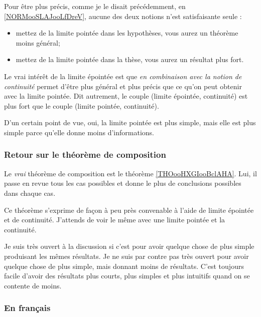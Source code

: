 Pour être plus précis, comme je le disait précédemment, en \ref{NORMooSLAJooLfDreV}, aucune des deux notions n'est satisfaisante seule :
\begin{itemize}
	\item mettez de la limite pointée dans les hypothèses, vous aurez un théorème moins général;
	\item mettez de la limite pointée dans la thèse, vous aurez un résultat plus fort.
\end{itemize}

Le vrai intérêt de la limite épointée est que \emph{en combinaison avec la notion de continuité} permet d'être plus général et plus précis que ce qu'on peut obtenir avec la limite pointée. Dit autrement, le couple (limite épointée, continuité) est plus fort que le couple (limite pointée, continuité).

D'un certain point de vue, oui, la limite pointée est plus simple, mais elle est plus simple parce qu'elle donne moins d'informations.

\subsubsection{Retour sur le théorème de composition}

Le \emph{vrai} théorème de composition est le théorème \ref{THOooHXGIooBclAHA}. Lui, il passe en revue tous les cas possibles et donne le plus de conclusions possibles dans chaque cas.

Ce théorème s'exprime de façon à peu près convenable à l'aide de limite épointée et de continuité. J'attends de voir le même avec une limite pointée et la continuité.

Je suis très ouvert à la discussion si c'est pour avoir quelque chose de plus simple produisant les mêmes résultats. Je ne suis par contre pas très ouvert pour avoir quelque chose de plus simple, mais donnant moins de résultats. C'est toujours facile d'avoir des résultats plus courts, plus simples et plus intuitifs quand on se contente de moins.

\subsubsection{En français}

